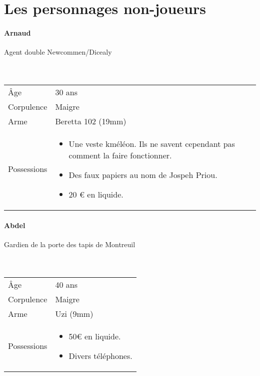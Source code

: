 \documentclass[10pt,a4paper,twocolumn]{article}
\begin{document}
\section*{Les personnages non-joueurs}
\hypertarget{arnaud}{\paragraph{Arnaud}} Agent double Newcommen/Dicealy\\ \\
\
\begin{tabular}{l|p{}}
	Âge & 30 ans\\
	Corpulence & Maigre \\
	Arme & Beretta 102 (19mm) \\
	Possessions & \begin{itemize}
	\item Une veste kméléon. Ils ne savent cependant pas comment la faire fonctionner.
	\item Des faux papiers au nom de Jospeh Priou.
	\item 20 € en liquide.
\end{itemize} \\
\end{tabular}
\hypertarget{abdel}{\paragraph{Abdel}} Gardien de la porte des tapis de Montreuil\\ \\
\
\begin{tabular}{l|p{0.3\textwidth}}
	Âge & 40 ans\\
	Corpulence & Maigre \\
	Arme & Uzi (9mm) \\
	Possessions & \begin{itemize}
	\item 50€ en liquide.
	\item Divers téléphones.
\end{itemize}	 \\
\end{tabular}
\end{document}
